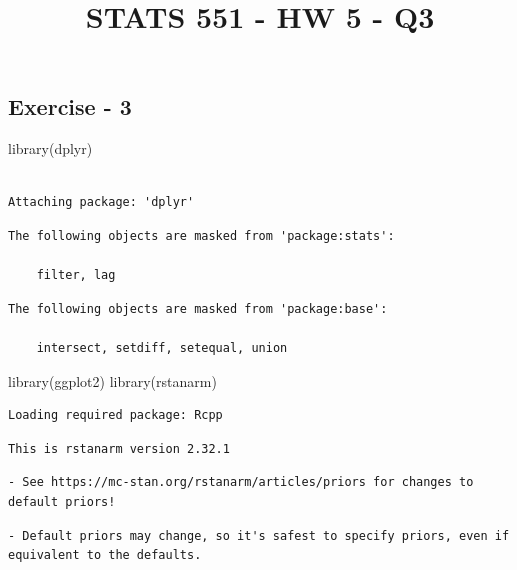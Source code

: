 \documentclass[
  10pt,
]{article}
\title{STATS 551 - HW 5 - Q3}
\author{}
\date{}
\newenvironment{Shaded}{\begin{snugshade}}{\end{snugshade}}
\newcommand{\FunctionTok}[1]{\textcolor[rgb]{0.28,0.35,0.67}{#1}}
\newcommand{\NormalTok}[1]{\textcolor[rgb]{0.00,0.23,0.31}{#1}}
\begin{document}
\maketitle


\subsection{Exercise - 3}\label{exercise---3}

\begin{Shaded}
\begin{Highlighting}[]
\FunctionTok{library}\NormalTok{(dplyr)}
\end{Highlighting}
\end{Shaded}

\begin{verbatim}

Attaching package: 'dplyr'
\end{verbatim}

\begin{verbatim}
The following objects are masked from 'package:stats':

    filter, lag
\end{verbatim}

\begin{verbatim}
The following objects are masked from 'package:base':

    intersect, setdiff, setequal, union
\end{verbatim}

\begin{Shaded}
\begin{Highlighting}[]
\FunctionTok{library}\NormalTok{(ggplot2)}
\FunctionTok{library}\NormalTok{(rstanarm)}
\end{Highlighting}
\end{Shaded}

\begin{verbatim}
Loading required package: Rcpp
\end{verbatim}

\begin{verbatim}
This is rstanarm version 2.32.1
\end{verbatim}

\begin{verbatim}
- See https://mc-stan.org/rstanarm/articles/priors for changes to default priors!
\end{verbatim}

\begin{verbatim}
- Default priors may change, so it's safest to specify priors, even if equivalent to the defaults.
\end{verbatim}
\end{document}
